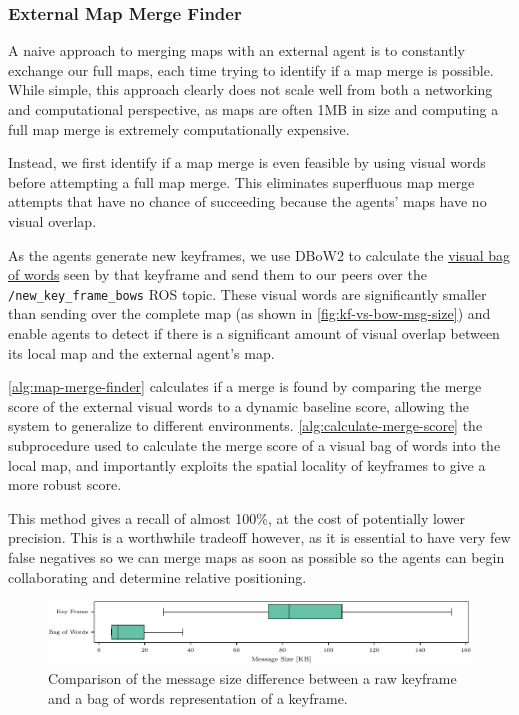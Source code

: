 \subsubsection{External Map Merge Finder}
\label{sec:external-map-merge-finder}
A naive approach to merging maps with an external agent is to constantly exchange our full maps, each time trying to identify if a map merge is possible. While simple, this approach clearly does not scale well from both a networking and computational perspective, as maps are often \>1MB in size and computing a full map merge is extremely computationally expensive.

Instead, we first identify if a map merge is even feasible by using visual words before attempting a full map merge. This eliminates superfluous map merge attempts that have no chance of succeeding because the agents' maps have no visual overlap.

As the agents generate new keyframes, we use DBoW2 \autocite{GalvezTRO12} to calculate the \hyperref[sec:visual-bag-of-words]{visual bag of words} seen by that keyframe and send them to our peers over the \texttt{/new\_key\_frame\_bows} ROS topic. These visual words are significantly smaller than sending over the complete map (as shown in \autoref{fig:kf-vs-bow-msg-size}) and enable agents to detect if there is a significant amount of visual overlap between its local map and the external agent's map.

\autoref{alg:map-merge-finder} calculates if a merge is found by comparing the merge score of the external visual words to a dynamic baseline score, allowing the system to generalize to different environments. \autoref{alg:calculate-merge-score} the subprocedure used to calculate the merge score of a visual bag of words into the local map, and importantly exploits the spatial locality of keyframes to give a more robust score.

This method gives a recall of almost 100\%, at the cost of potentially lower precision. This is a worthwhile tradeoff however, as it is essential to have very few false negatives so we can merge maps as soon as possible so the agents can begin collaborating and determine relative positioning.

\begin{figure}[h]
    \centering
    \includegraphics[width=\linewidth]{figures/apr20_mh_trajectory_g_kf_vs_bow_msg_size.pdf}
    \caption{Comparison of the message size difference between a raw keyframe and a bag of words representation of a keyframe.}
    \label{fig:kf-vs-bow-msg-size}
\end{figure}

